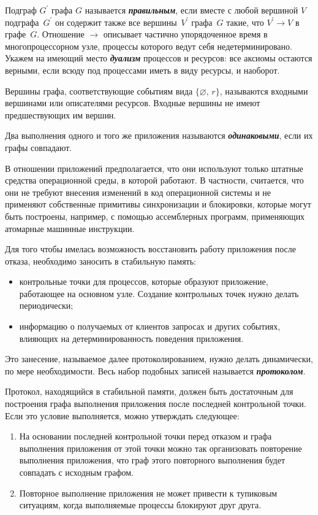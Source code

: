 \begin{multicols}{2}
Подграф $G^\prime$ графа $G$ называется {\bfseries\textit{правильным}}, если 
вместе с любой вершиной $V$ подграфа~$G^\prime$ он содержит также все 
вершины~$V^\prime$ графа~$G$ такие, что $V^\prime \rightarrow V$ в графе~$G$. 
Отношение $\rightarrow$ описывает час\-тич\-но упорядоченное время в 
многопроцессорном узле, процессы которого ведут себя недетерминировано. Укажем 
на имеющий место {\bfseries\textit{дуализм}} процессов и ресурсов: все аксиомы 
остаются верными, если всюду под процессами иметь в виду ресурсы, и наоборот.

Вершины графа, соответствующие событиям вида $\{\varnothing ,\,r\}$,
называются входными вершинами или описателями ресурсов. Входные
вершины не имеют предшествующих им вершин.

Два выполнения одного и того же приложения называются
{\bfseries\textit{одинаковыми}}, если их графы совпадают.

В отношении приложений предполагается, что они используют только
штатные средства операционной среды, в которой работают. В частности,
считается, что они не требуют внесения изменений в код операционной
системы и не применяют собственные примитивы синхронизации и
блокировки, которые могут быть построены, например, с помощью
ассемблерных программ, применяющих атомарные машинные инструкции.

Для того чтобы имелась возможность восстановить работу приложения после
отказа, необходимо заносить в стабильную память:
\begin{itemize}
\item контрольные точки для процессов, которые образуют
приложение, работающее на основном узле. Создание контрольных точек
нужно делать периодически;
\item информацию о получаемых от клиентов запросах и других
событиях, влияющих на детерминированность поведения приложения.
\end{itemize}

Это занесение, называемое далее протоколированием, нужно делать
динамически, по мере необходимости. Весь набор подобных записей
называется {\bfseries\textit{протоколом}}.

Протокол, находящийся в стабильной памяти, должен быть
достаточным для построения графа выполнения приложения после последней
контрольной точки. Если это условие выполняется, можно утверждать
следующее:
\begin{enumerate}[1.]
\item На основании последней контрольной точки перед отказом и графа
выполнения приложения от этой точки можно так организовать повторение
выполнения приложения, что граф этого повторного выполнения будет
совпадать с исходным графом.
\item Повторное выполнение приложения не может привести к тупиковым
ситуациям, когда выполняемые процессы блокируют друг друга.
\end{enumerate}


\end{multicols}
